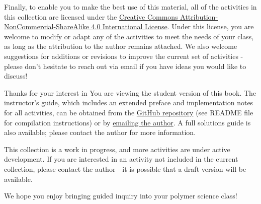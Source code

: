 {Finally, to enable you to make the best use of this material, all of the activities in this collection are licensed under the \href{http://creativecommons.org/licenses/by-nc-sa/4.0/}{Creative Commons Attribution-NonCommercial-ShareAlike 4.0 International License}.  Under this license, you are welcome to modify or adapt any of the activities to meet the needs of your class, as long as the attribution to the author remains attached.  We also welcome suggestions for additions or revisions to improve the current set of activities - please don't hesitate to reach out via email if you have ideas you would like to discuss!

	\color{black}

}{%

	Thanks for your interest in \thetitle{!} You are viewing the student version of this book.  The instructor's guide, which includes an extended preface and implementation notes for all activities, can be obtained from the \href{https://github.com/jlaaser/pogil-polymers}{GitHub repository} (see README file for compilation instructions) or by \href{mailto:j.laaser@pitt.edu}{emailing the author}.  A full solutions guide is also available; please contact the author for more information.
	
	This collection is a work in progress, and more activities are under active development.  If you are interested in an activity not included in the current collection, please contact the author - it is possible that a draft version will be available. 
	
	We hope you enjoy bringing guided inquiry into your polymer science class!

}

